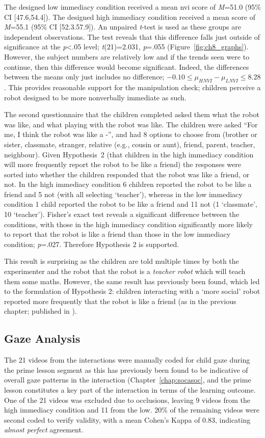 The designed low immediacy condition received a mean \acrshort{nvi} score of \textit{M}=51.0 (95\% CI [47.6,54.4]). The designed high immediacy condition received a mean score of \textit{M}=55.1 (95\% CI [52.3.57.9]). An unpaired \textit{t}-test is used as these groups are independent observations. The test reveals that this difference falls just outside of significance at the \textit{p}\textless .05 level; \textit{t}(21)=2.031, \textit{p}=.055 (Figure~\ref{fig:ch8_graphs}). However, the subject numbers are relatively low and if the trends seen were to continue, then this difference would become significant. Indeed, the differences between the means only just includes no difference; $-0.10 \leq \mu _{HNVI} - \mu _{LNVI} \leq 8.28$. This provides reasonable support for the manipulation check; children perceive a robot designed to be more nonverbally immediate as such.

The second questionnaire that the children completed asked them what the robot was like, and what playing with the robot was like. The children were asked ``For me, I think the robot was like a -'', and had 8 options to choose from (brother or sister, classmate, stranger, relative (e.g., cousin or aunt), friend, parent, teacher, neighbour). Given Hypothesis~2 (that children in the high immediacy condition will more frequently report the robot to be like a friend) the responses were sorted into whether the children responded that the robot was like a friend, or not. In the high immediacy condition 6 children reported the robot to be like a friend and 5 not (with all selecting `teacher'), whereas in the low immediacy condition 1 child reported the robot to be like a friend and 11 not (1 `classmate', 10 `teacher'). Fisher's exact test reveals a significant difference between the conditions, with those in the high immediacy condition significantly more likely to report that the robot is like a friend than those in the low immediacy condition; \textit{p}=.027. Therefore Hypothesis 2 is supported.

This result is surprising as the children are told multiple times by both the experimenter and the robot that the robot is a \textit{teacher robot} which will teach them some maths. However, the same result has previously been found, which led to the formulation of Hypothesis 2: children interacting with a `more social' robot reported more frequently that the robot is like a friend (as in the previous chapter; published in \citealp{kennedy2015robot}).

\subsection{Gaze Analysis}
The 21 videos from the interactions were manually coded for child gaze during the prime lesson segment as this has previously been found to be indicative of overall gaze patterns in the interaction (Chapter~\ref{chap:socasoc}, and the prime lesson constitutes a key part of the interaction in terms of the \gls{learning} outcome. One of the 21 videos was excluded due to occlusions, leaving 9 videos from the high immediacy condition and 11 from the low. 20\% of the remaining videos were second coded to verify validity, with a mean Cohen's Kappa of 0.83, indicating \textit{almost perfect} agreement.

